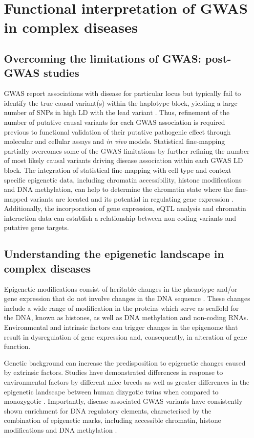 \section{Functional interpretation of GWAS in complex diseases}

\subsection{Overcoming the limitations of GWAS: post-GWAS studies}
\textcolor[rgb]{1,0,0}{GWAS report associations with disease for particular locus but typically fail to identify the true causal variant(s) within the haplotype block, yielding a large number of SNPs in high LD with the lead variant \parencite{Edwards2013}. Thus, refinement of the number of putative causal variants for each GWAS association is required previous to functional validation of their putative pathogenic effect through molecular and cellular assays and \textit{in vivo} models. Statistical fine-mapping partially overcomes some of the GWAS limitations by further refining the number of most likely causal variants driving disease association within each GWAS LD block. The integration of statistical fine-mapping with cell type and context specific epigenetic data, including chromatin accessibility, histone modifications and DNA methylation, can help to determine the chromatin state where the fine-mapped variants are located and its potential in regulating gene expression \parencite{Petronis2010}. Additionally, the incorporation of gene expression, eQTL analysis and chromatin interaction data can establish a relationship between non-coding variants and putative gene targets.}


\subsection{Understanding the epigenetic landscape in complex diseases}
\label{subsec:Epigenetics}

Epigenetic modifications consist of heritable changes in the phenotype and/or gene expression that do not involve changes in the DNA sequence \parencite{Feil2012}. These changes include a wide range of modification in the proteins which serve as scaffold for the DNA, known as histones, as well as DNA methylation and non-coding RNAs. Environmental and intrinsic factors can trigger changes in the epigenome that result in dysregulation of gene expression and, consequently, in alteration of gene function.

Genetic background can increase the predisposition to epigenetic changes caused by extrinsic factors. Studies have demonstrated differences in response to environmental factors by different mice breeds as well as greater differences in the epigenetic landscape between human dizygotic twins when compared to monozygotic \parencite{Pogribny2009,Kaminsky2009}. Importantly, disease-associated GWAS variants have consistently shown enrichment for DNA regulatory elements, characterised by the combination of epigenetic marks, including accessible chromatin, histone modifications and DNA methylation \parencite{Trynka2013,Trynka2013b,Gusev2014}. 

